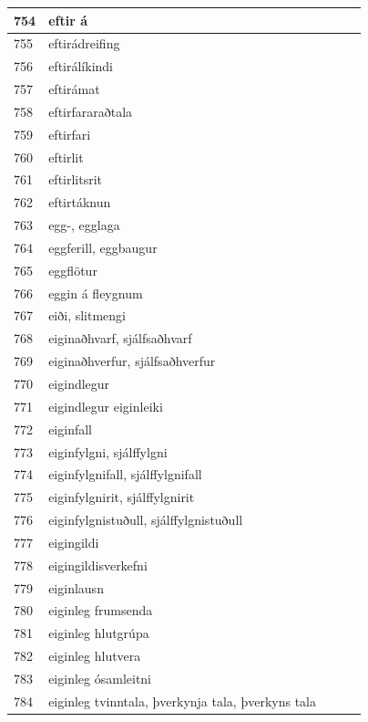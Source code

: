 \begin{longtable}{p{}|p{}|p{}|p{}|p{}}
754 & eftir á &  &  &  \\
\hline
755 & eftirádreifing &  &  &  \\
\hline
756 & eftirálíkindi &  &  &  \\
\hline
757 & eftirámat &  &  &  \\
\hline
758 & eftirfararaðtala &  &  &  \\
\hline
759 & eftirfari &  &  & \\
\hline
760 & eftirlit &  &  &  \\
\hline
761 & eftirlitsrit &  &  &  \\
\hline
762 & eftirtáknun &  &  &  \\
\hline
763 & egg-, egglaga &  &  &  \\
\hline
764 & eggferill, eggbaugur &  &  &  \\
\hline
765 & eggflötur &  &  &  \\
\hline
766 & eggin á fleygnum &  &  &  \\
\hline
767 & eiði, slitmengi &  &  &  \\
\hline
768 & eiginaðhvarf, sjálfsaðhvarf &  &  &  \\
\hline
769 & eiginaðhverfur, sjálfsaðhverfur &  &  &  \\
\hline
770 & eigindlegur &  &  &  \\
\hline
771 & eigindlegur eiginleiki &  &  &  \\
\hline
772 & eiginfall &  &  &  \\
\hline
773 & eiginfylgni, sjálffylgni &  &  &  \\
\hline
774 & eiginfylgnifall, sjálffylgnifall &  &  &  \\
\hline
775 & eiginfylgnirit, sjálffylgnirit &  &  &  \\
\hline
776 & eiginfylgnistuðull, sjálffylgnistuðull &  &  &  \\
\hline
777 & eigingildi &  &  &  \\
\hline
778 & eigingildisverkefni &  &  &  \\
\hline
779 & eiginlausn &  &  &  \\
\hline
780 & eiginleg frumsenda &  &  &  \\
\hline
781 & eiginleg hlutgrúpa &  &  &  \\
\hline
782 & eiginleg hlutvera &  &  &  \\
\hline
783 & eiginleg ósamleitni &  &  &  \\
\hline
784 & eiginleg tvinntala, þverkynja tala, þverkyns tala &  &  &  \\
\hline

\end{longtable}
